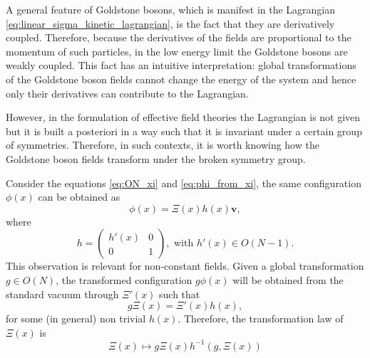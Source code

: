 A general feature of Goldstone bosons, which is manifest in the Lagrangian \eqref{eq:linear_sigma_kinetic_lagrangian}, is the fact that they are derivatively coupled. Therefore, because the derivatives of the fields are proportional to the momentum of such particles, in the low energy limit the Goldstone bosons are weakly coupled. This fact has an intuitive interpretation: global transformations of the Goldstone boson fields cannot change the energy of the system and hence only their derivatives can contribute to the Lagrangian.

However, in the formulation of effective field theories the Lagrangian is not given but it is built a posteriori in a way such that it is invariant under a certain group of symmetries. Therefore, in such contexts, it is worth knowing how the Goldstone boson fields transform under the broken symmetry group.

Consider the equations \eqref{eq:ON_xi} and \eqref{eq:phi_from_xi}, the same configuration $\phi(x)$ can be obtained as 
\begin{equation}
  \phi(x) = \Xi (x) h (x) \symbf{v} ,
\end{equation}
where
\begin{equation}
  h = \begin{pmatrix} h'(x) & 0 \\ 0 & 1 \end{pmatrix} , \text{ with } h'(x) \in O(N-1) .
\end{equation}
This observation is relevant for non-constant fields. Given a global transformation $g \in O(N)$, the transformed configuration $g \phi(x)$ will be obtained from the standard vacuum through $\Xi'(x)$ such that 
\begin{equation}
  g \Xi(x) = \Xi'(x) h(x) ,
  \label{eq:ccwz_condition}
\end{equation}
for some (in general) non trivial $h(x)$. Therefore, the transformation law of $\Xi(x)$ is
\begin{equation}
  \Xi(x) \mapsto g \Xi (x) h^{-1}\left( g , \Xi (x) \right)
  \label{eq:ccwz_transformation_law}
\end{equation}

